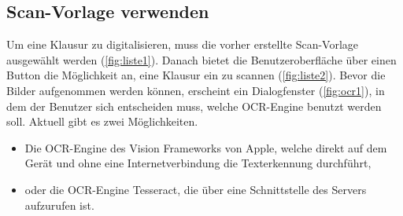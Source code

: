 \documentclass[notables, nomenclature, oneside, 150]{HSMW-Thesis}
\begin{document}
		\subsection{Scan-Vorlage verwenden}
			Um eine Klausur zu digitalisieren, muss die vorher erstellte Scan-Vorlage ausgewählt werden (\ref{fig:liste1}). Danach bietet die Benutzeroberfläche über einen Button die Möglichkeit an, eine Klausur ein zu scannen (\ref{fig:liste2}). Bevor die Bilder aufgenommen werden können, erscheint ein Dialogfenster (\ref{fig:ocr1}), in dem der Benutzer sich entscheiden muss, welche OCR-Engine benutzt werden soll. Aktuell gibt es zwei Möglichkeiten.
			\begin{itemize}
				\item Die OCR-Engine des Vision Frameworks von Apple, welche direkt auf dem Gerät und ohne eine Internetverbindung die Texterkennung durchführt,  
				\item oder die OCR-Engine Tesseract, die über eine Schnittstelle des Servers aufzurufen ist.
			\end{itemize}
				
\end{document}
